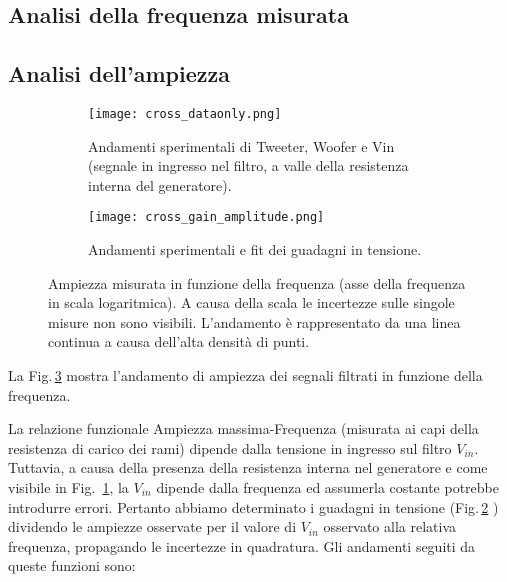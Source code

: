 \documentclass[../Relazione_circuiti]{subfiles}
\begin{document}
\subsection{Analisi della frequenza misurata}

\subsection{Analisi dell'ampiezza}

  \begin{figure}[H]
    \centering

    \begin{subfigure}[t]{=0.49\textwidth}

      \texttt{[image: cross\_dataonly.png]}

      \caption{Andamenti sperimentali di Tweeter, Woofer e Vin (segnale in ingresso nel filtro,
        a valle della resistenza interna del generatore).}
      \label{fig: amplitude_dataonly}

    \end{subfigure}
    \hfill
    \begin{subfigure}[t]{=0.49\textwidth}

      \texttt{[image: cross\_gain\_amplitude.png]}

      \caption
      {Andamenti sperimentali e fit dei guadagni in tensione.}
      \label{fig:cross_gain}
    \end{subfigure}

    \caption{Ampiezza misurata in funzione della frequenza (asse della frequenza in scala logaritmica). A causa della scala le incertezze sulle singole misure non sono visibili. L'andamento è rappresentato da una
      linea continua a causa dell'alta densità di punti.}
    \label{fig:cross_amplitude}

  \end{figure}

  La Fig.\,\ref{fig:cross_amplitude} mostra l'andamento di ampiezza dei segnali filtrati in funzione della frequenza.

  La relazione funzionale Ampiezza massima-Frequenza (misurata ai capi della resistenza di carico dei rami) dipende
  dalla tensione in ingresso sul filtro $V_{in}$.
  Tuttavia, a causa della presenza della resistenza interna nel generatore e come visibile in Fig.
 \,\ref{fig: amplitude_dataonly}, la $V_{in}$
  dipende dalla frequenza ed assumerla costante potrebbe introdurre errori.
  Pertanto abbiamo determinato i guadagni in tensione (Fig.\,\ref{fig:cross_gain}
  ) dividendo le ampiezze osservate per il valore di $V_{in}$
  osservato alla relativa frequenza, propagando le incertezze in quadratura. Gli andamenti seguiti da queste funzioni sono: 
\end{document}
